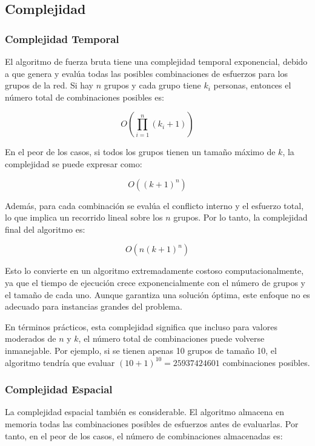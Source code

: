\documentclass[11pt,letter]{article}
\begin{document}
    \subsection{Complejidad}

    \subsubsection{Complejidad Temporal}

    El algoritmo de fuerza bruta tiene una complejidad temporal exponencial, debido a que genera y evalúa todas las posibles combinaciones de esfuerzos para los grupos de la red. Si hay $n$ grupos y cada grupo tiene $k_i$ personas, entonces el número total de combinaciones posibles es:

    \[
        O\left(\prod_{i=1}^{n}(k_i + 1)\right)
    \]

    En el peor de los casos, si todos los grupos tienen un tamaño máximo de $k$, la complejidad se puede expresar como:

    \[
        O\left((k + 1)^n\right)
    \]

    Además, para cada combinación se evalúa el conflicto interno y el esfuerzo total, lo que implica un recorrido lineal sobre los $n$ grupos. Por lo tanto, la complejidad final del algoritmo es:

    \[
        O\left(n (k + 1)^n\right)
    \]

    Esto lo convierte en un algoritmo extremadamente costoso computacionalmente, ya que el tiempo de ejecución crece exponencialmente con el número de grupos y el tamaño de cada uno. Aunque garantiza una solución óptima, este enfoque no es adecuado para instancias grandes del problema.

    En términos prácticos, esta complejidad significa que incluso para valores moderados de $n$ y $k$, el número total de combinaciones puede volverse inmanejable. Por ejemplo, si se tienen apenas 10 grupos de tamaño 10, el algoritmo tendría que evaluar $(10 + 1)^{10} = 25937424601$ combinaciones posibles.

    \subsubsection{Complejidad Espacial}

    La complejidad espacial también es considerable. El algoritmo almacena en memoria todas las combinaciones posibles de esfuerzos antes de evaluarlas. Por tanto, en el peor de los casos, el número de combinaciones almacenadas es:
\end{document}
